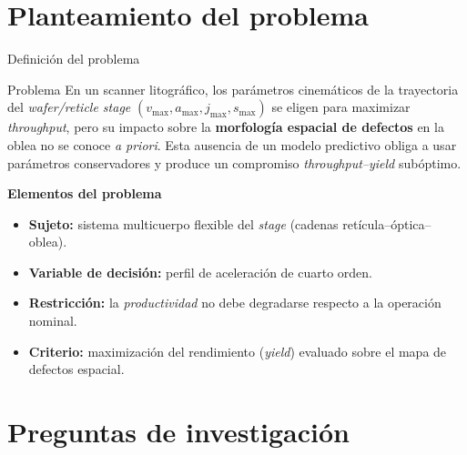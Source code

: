 \documentclass[en,16:9,navbarinline,bigfoot]{sdqbeamer}
\begin{document}
\section{Planteamiento del problema}

\begin{frame}{Definición del problema}
    \begin{redblock}{Problema}
        En un scanner litográfico, los parámetros cinemáticos de la trayectoria del \textit{wafer/reticle stage} $(v_{\max}, a_{\max}, j_{\max}, s_{\max})$ se eligen para maximizar \textit{throughput}, pero su impacto sobre la \textbf{morfología espacial de defectos} en la oblea no se conoce \emph{a priori}. Esta ausencia de un modelo predictivo obliga a usar parámetros conservadores y produce un compromiso \textit{throughput--yield} subóptimo.
    \end{redblock}
    \vspace{0.15cm}
    \textbf{Elementos del problema}
    \begin{itemize}
        \item \textbf{Sujeto:} sistema multicuerpo flexible del \textit{stage} (cadenas retícula--óptica--oblea).
        \item \textbf{Variable de decisión:} perfil de aceleración de cuarto orden.
        \item \textbf{Restricción:} la \textit{productividad} no debe degradarse respecto a la operación nominal.
        \item \textbf{Criterio:} maximización del rendimiento (\textit{yield}) evaluado sobre el mapa de defectos espacial.
    \end{itemize}
\end{frame}

\section{Preguntas de investigación}
\end{document}
